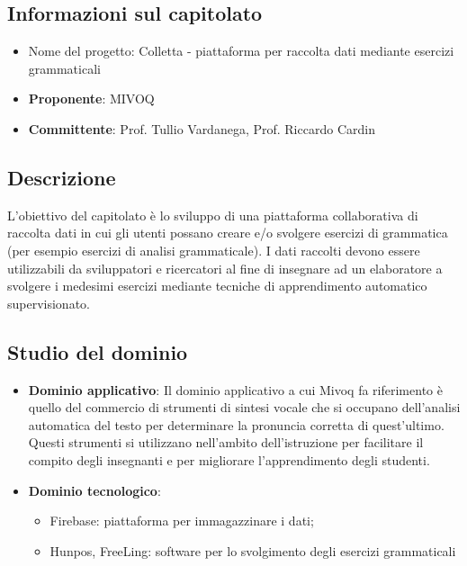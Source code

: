 \subsection{Informazioni sul capitolato}
    \begin{itemize}
        \item Nome del progetto: Colletta - piattaforma per raccolta dati mediante esercizi grammaticali
        \item \textbf{Proponente}: MIVOQ
        \item \textbf{Committente}: Prof. Tullio Vardanega, Prof. Riccardo Cardin
    \end{itemize}
\subsection{Descrizione}
L'obiettivo del capitolato è lo sviluppo di una piattaforma collaborativa di raccolta dati in cui gli utenti possano creare e/o
svolgere esercizi di grammatica (per esempio esercizi di analisi grammaticale). I  dati  raccolti  devono essere utilizzabili da sviluppatori e ricercatori al fine di insegnare ad un elaboratore a svolgere i medesimi esercizi mediante tecniche di apprendimento automatico supervisionato.
   

\subsection{Studio del dominio}
     \begin{itemize}
        \item \textbf{Dominio applicativo}: Il dominio applicativo a cui Mivoq fa riferimento è quello del commercio di strumenti di sintesi vocale che si occupano dell'analisi automatica del testo per determinare la pronuncia corretta di quest'ultimo. Questi strumenti si utilizzano nell'ambito dell'istruzione per facilitare il compito degli insegnanti e per migliorare l'apprendimento degli studenti.

        \item \textbf{Dominio tecnologico}: 
            \begin{itemize}
                \item Firebase: piattaforma per  immagazzinare i dati;  
                \item Hunpos, FreeLing: software  per lo svolgimento degli esercizi grammaticali 
            \end{itemize}
        

    \end{itemize}
